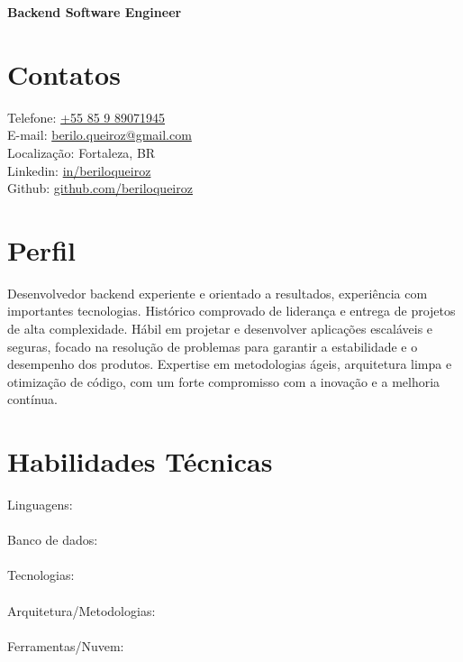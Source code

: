 \documentclass[11pt,a4paper,sans]{moderncv}
\begin{document}
\makecvtitle
\vspace*{-16mm}
\begin{center}\textbf{ Backend Software Engineer}\end{center}

\section{Contatos}
 {
  \begin{samepage}
	  \faMobile\enspace Telefone: {\color{blue}\href{tel:+5585989071945}{+55 85 9 89071945}} \\
	  \faEnvelope\enspace E-mail: {\color{blue}\href{mailto:berilo.queiroz@gmail.com}{berilo.queiroz@gmail.com}} \\
	  \faHome\enspace Localização: Fortaleza, BR \\
	  \faLinkedin\enspace Linkedin: {\color{blue}\href{https://www.linkedin.com/in/beriloqueiroz}{in/beriloqueiroz}}\\
	  \faGithub\enspace Github: {\color{blue} \href{https://github.com/beriloqueiroz}{github.com/beriloqueiroz}}
  \end{samepage}
 }
\section{Perfil}
 {
  Desenvolvedor backend experiente e orientado a resultados, experiência com importantes tecnologias.
  Histórico comprovado de liderança e entrega de projetos de alta complexidade. Hábil
  em projetar e desenvolver aplicações escaláveis e seguras, focado na resolução de problemas para garantir
  a estabilidade e o desempenho dos produtos. Expertise em metodologias ágeis, arquitetura limpa e
  otimização de código, com um forte compromisso com a inovação e a melhoria contínua.
 }

\section{Habilidades Técnicas}
 {
  Linguagens:      
    \\
  \\
  Banco de dados:    \\
  \\
  Tecnologias:    \\
  \\
  Arquitetura/Metodologias:      \\
  \\
  Ferramentas/Nuvem:    \\
 }
\end{document}
